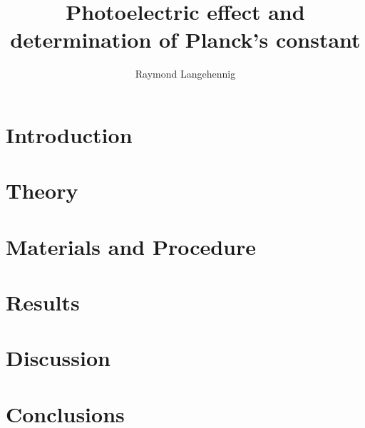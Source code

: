 \documentclass{article}
\title{Photoelectric effect and determination of Planck's constant}
\author{Raymond Langehennig}
\begin{document}
\maketitle

\section{Introduction}

\section{Theory}

\section{Materials and Procedure}

\section{Results}

\section{Discussion}

\section{Conclusions}
\end{document}
